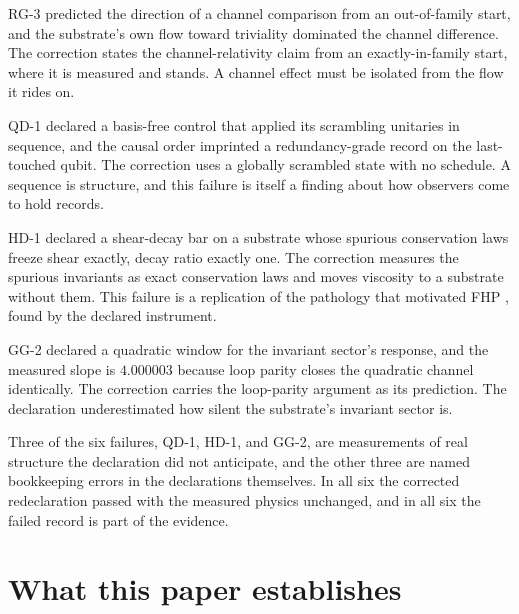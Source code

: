 \documentclass[aps,pre,reprint,nofootinbib,floatfix]{revtex4-2}
\begin{document}
RG-3 predicted the direction of a channel comparison from an
out-of-family start, and the substrate's own flow toward triviality
dominated the channel difference.  The correction states the
channel-relativity claim from an exactly-in-family start, where it
is measured and stands.  A channel effect must be isolated from the
flow it rides on.

QD-1 declared a basis-free control that applied its scrambling
unitaries in sequence, and the causal order imprinted a
redundancy-grade record on the last-touched qubit.  The correction
uses a globally scrambled state with no schedule.  A sequence is
structure, and this failure is itself a finding about how observers
come to hold records.

HD-1 declared a shear-decay bar on a substrate whose spurious
conservation laws freeze shear exactly, decay ratio exactly one.
The correction measures the spurious invariants as exact
conservation laws and moves viscosity to a substrate without them.
This failure is a replication of the pathology that motivated FHP
\cite{FHP1986}, found by the declared instrument.

GG-2 declared a quadratic window for the invariant sector's
response, and the measured slope is $4.000003$ because loop parity
closes the quadratic channel identically.  The correction carries
the loop-parity argument as its prediction.  The declaration
underestimated how silent the substrate's invariant sector is.

Three of the six failures, QD-1, HD-1, and GG-2, are measurements
of real structure the declaration did not anticipate, and the other
three are named bookkeeping errors in the declarations themselves.
In all six the corrected redeclaration passed with the measured
physics unchanged, and in all six the failed record is part of the
evidence.

\section{What this paper establishes}
\label{sec:claims}
\end{document}
